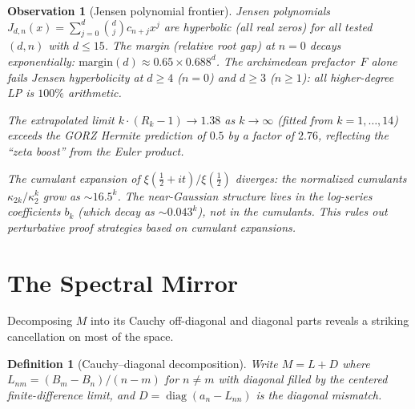 \documentclass[11pt,a4paper]{article}
\newtheorem{observation}{Observation}[section]
\newtheorem{definition}{Definition}[section]
\DeclareMathOperator{\diag}{diag}
\begin{document}
\begin{observation}[Jensen polynomial frontier]\label{obs:jensen}
Jensen polynomials $J_{d,n}(x) = \sum_{j=0}^d \binom{d}{j} c_{n+j} x^j$ are hyperbolic (all real zeros) for all tested $(d, n)$ with $d \leq 15$. The margin (relative root gap) at $n = 0$ decays exponentially: $\mathrm{margin}(d) \approx 0.65 \times 0.688^d$. The archimedean prefactor~$F$ alone fails Jensen hyperbolicity at $d \geq 4$ ($n = 0$) and $d \geq 3$ ($n \geq 1$): all higher-degree LP is $100\%$ arithmetic.

The extrapolated limit $k \cdot (R_k - 1) \to 1.38$ as $k \to \infty$ (fitted from $k = 1, \ldots, 14$) exceeds the GORZ Hermite prediction of $0.5$ by a factor of $2.76$, reflecting the ``zeta boost'' from the Euler product.

The cumulant expansion of $\xi(\tfrac{1}{2} + it)/\xi(\tfrac{1}{2})$ \emph{diverges}: the normalized cumulants $\kappa_{2k}/\kappa_2^k$ grow as $\sim 16.5^k$. The near-Gaussian structure lives in the log-series coefficients $b_k$ (which decay as $\sim 0.043^k$), not in the cumulants. This rules out perturbative proof strategies based on cumulant expansions.
\end{observation}

\section{The Spectral Mirror}\label{sec:mirror}

Decomposing $M$ into its Cauchy off-diagonal and diagonal parts reveals a striking cancellation on most of the space.

\begin{definition}[Cauchy--diagonal decomposition]
Write $M = L + D$ where $L_{nm} = (B_m - B_n)/(n-m)$ for $n \neq m$ with diagonal filled by the centered finite-difference limit, and $D = \diag(a_n - L_{nn})$ is the diagonal mismatch.
\end{definition}
\end{document}
